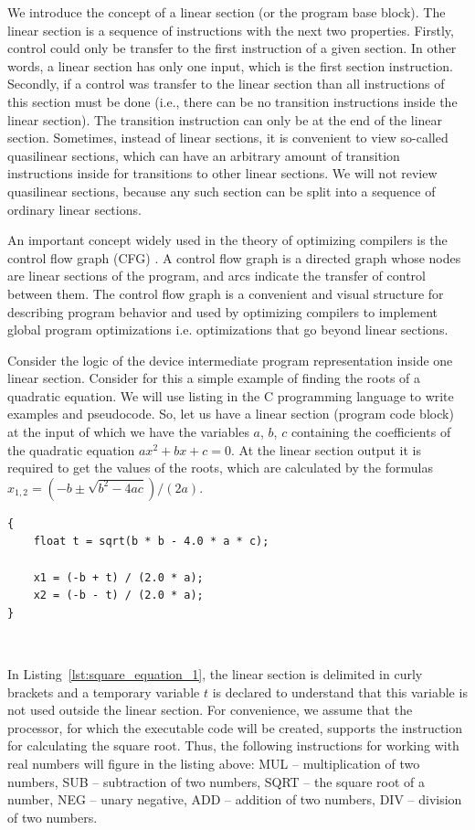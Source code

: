 \documentclass[
11pt,%
tightenlines,%
twoside,%
onecolumn,%
nofloats,%
nobibnotes,%
nofootinbib,%
superscriptaddress,%
noshowpacs,%
centertags]%
{revtex4}
\begin{document}
We introduce the concept of a linear section (or the program base block).
The linear section is a sequence of instructions with the next two properties.
Firstly, control could only be transfer to the first instruction of a given section.
In other words, a linear section has only one input, which is the first section instruction.
Secondly, if a control was transfer to the linear section than all instructions of this section must be done (i.e., there can be no transition instructions inside the linear section).
The transition instruction can only be at the end of the linear section.
Sometimes, instead of linear sections, it is convenient to view so-called quasilinear sections, which can have an arbitrary amount of transition instructions inside for transitions to other linear sections.
We will not review quasilinear sections, because any such section can be split into a sequence of ordinary linear sections.

An important concept widely used in the theory of optimizing compilers is the control flow graph (CFG) \cite{Muchnick}.
A control flow graph is a directed graph whose nodes are linear sections of the program, and arcs indicate the transfer of control between them.
The control flow graph is a convenient and visual structure for describing program behavior and used by optimizing compilers to implement global program optimizations i.e. optimizations that go beyond linear sections.

Consider the logic of the device intermediate program representation inside one linear section.
Consider for this a simple example of finding the roots of a quadratic equation.
We will use listing in the C programming language to write examples and pseudocode.
So, let us have a linear section (program code block) at the input of which we have the variables $a$, $b$, $c$ containing the coefficients of the quadratic equation $ax^2 + bx + c = 0$.
At the linear section output it is required to get the values of the roots, which are calculated by the formulas $x_{1,2} = (-b \pm \sqrt{b^2 - 4ac})/(2a)$.

\begin{lstlisting}[caption={The code block for calculating the roots of the quadratic equation.},label={lst:square_equation_1}]
{
    float t = sqrt(b * b - 4.0 * a * c);
    
    x1 = (-b + t) / (2.0 * a);
    x2 = (-b - t) / (2.0 * a);
}
\end{lstlisting}

\

In Listing~\ref{lst:square_equation_1}, the linear section is delimited in curly brackets and a temporary variable $t$ is declared to understand that this variable is not used outside the linear section.
For convenience, we assume that the processor, for which the executable code will be created, supports the instruction for calculating the square root.
Thus, the following instructions for working with real numbers will figure in the listing above: MUL -- multiplication of two numbers, SUB -- subtraction of two numbers, SQRT -- the square root of a number, NEG -- unary negative, ADD -- addition of two numbers, DIV -- division of two numbers.
\end{document}
